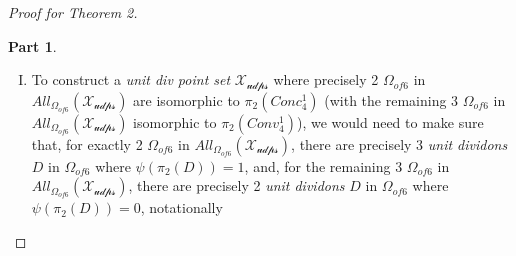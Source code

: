 \documentclass[11pt, oneside]{article}      %
\theoremstyle{definition}
\newtheorem{proofpart}{Part}[theo]
\numberwithin{equation}{section}
\newcommand{\reff}[1]{(\ref{#1})}
\newcommand\undervec[1]{\underaccent{\vec}{#1}}
\theoremstyle{c}
\begin{document}
\begin{proof}[Proof for Theorem 2]
\begin{proofpart}
\begin{enumerate}[I.]
\begin{align}
\begin{split}
&\forall D' \in D^* \\
&\quad | \{ D \in D^* :   \pi_1(D) = \pi_1(D') \} | = 2
\end{split}
\end{align}
One way to go about achieving that is to let $D_n^1 \not=  D_n^2$ for every $n \in \{1,2,3,4,5\}$ while avoiding $D_n^1 =  D_m^1 \land D_n^2 =  D_m^2$ for any distinct $m$ and $n$. Starting from $D_1$ and going all the way to $D_5$ and we would have
\begin{equation}
\begin{gathered}
\pi_1(D_1^1) = \bigcup \pi_2(D_1^2) = \pi_1(D_2^1) =\bigcup \pi_2(D_2^2) = A\\
\pi_1(D_1^2) = \bigcup \pi_2(D_1^1) = \pi_1(D_3^1) =\bigcup \pi_2(D_3^2) = B\\
\pi_1(D_2^2) = \bigcup \pi_2(D_2^1) = \pi_1(D_4^1) =\bigcup \pi_2(D_4^2) = C\\
\pi_1(D_3^2) = \bigcup \pi_2(D_3^1) = \pi_1(D_6^1) =\bigcup \pi_2(D_6^2) = D \\
\pi_1(D_4^2) = \bigcup \pi_2(D_4^1) = \pi_1(D_5^1) =\bigcup \pi_2(D_5^2) = E\\
\pi_1(D_5^2) = \bigcup \pi_2(D_5^1) = \pi_1(D_6^2) =\bigcup \pi_2(D_6^1) = F
\end{gathered}
\end{equation}
for some 2-cardinality subsets $A,B,C,D,E,F$ of $\pi_1(\mathscr{X_{udps}})$, where
\begin{gather*}
A \not=B \not=C \not=D \not=E \not=F \\
(A \cap B) = (A \cap C) =  (B \cap F) = (C \cap D) = (D \cap E) = (E \cap F) = \varnothing
\end{gather*}
$\mathscr{X_{udps}}$ described above is in $\mathscr{UDPS}^{\Theta}$ because there exists $\mathscr{X_{dps}} \in \mathscr{DPS}^+$ where $\undervec{\mathscr{F}}_{\mathscr{udps}}^{\mathscr{DPS}}(\mathscr{X_{dps}})=\mathscr{X_{udps}}$: such $\mathscr{X_{dps}}$ would be isomorphic to $Conv_5$ defined in \reff{stronger-theorem-2}.
\item To construct a \textit{unit div point set} $\mathscr{X_{udps}}$ where precisely 2 $\Omega_{of 6}$ in $All_{\Omega_{of 6}}(\mathscr{X_{udps}})$ are isomorphic to $\pi_2(Conc_4^1)$ (with the remaining 3 $\Omega_{of 6}$ in $All_{\Omega_{of 6}}(\mathscr{X_{udps}})$ isomorphic to $\pi_2(Conv_4^1)$), we would need to make sure that, for exactly 2 $\Omega_{of 6}$ in $All_{\Omega_{of 6}}(\mathscr{X_{udps}})$, there are precisely 3 \textit{unit dividons} $D$ in $\Omega_{of 6}$ where $\psi(\pi_2(D)) = 1$, and, for the remaining 3 $\Omega_{of 6}$ in $All_{\Omega_{of 6}}(\mathscr{X_{udps}})$, there are precisely 2 \textit{unit dividons} $D$ in $\Omega_{of 6}$ where $\psi(\pi_2(D)) = 0$, notationally

\end{enumerate}
\end{proofpart}
\end{proof}
\end{document}
